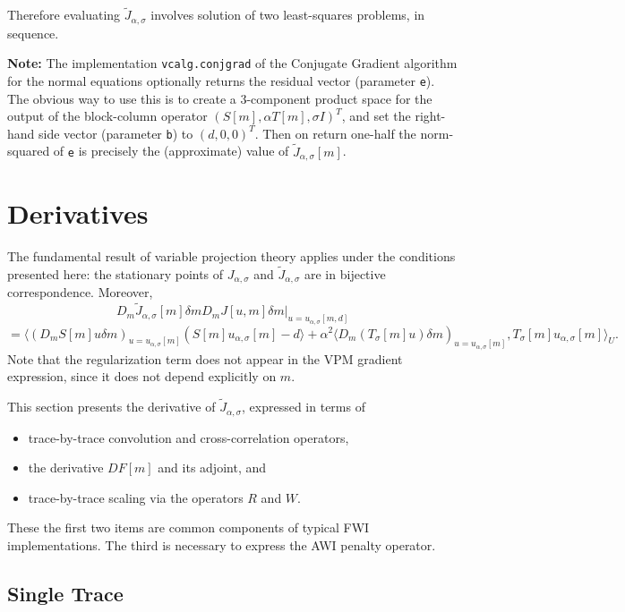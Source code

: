 Therefore evaluating $\tilde{J}_{\alpha,\sigma}$ involves solution of
two least-squares problems, in sequence.

{\bf Note:} The implementation {\tt vcalg.conjgrad} of the Conjugate Gradient algorithm for the normal equations optionally returns the residual vector (parameter {\tt e}). The obvious way to use this is to create a 3-component product space for the output of the block-column operator $(S[m],\alpha T[m], \sigma I)^T$, and set the right-hand side vector (parameter {\tt b})
to $(d,0,0)^T$. Then on return one-half the norm-squared of {\tt e} is precisely the (approximate) value of $\tilde{J}_{\alpha,\sigma}[m]$.

\section{Derivatives}
The fundamental result of variable projection theory
\cite[]{GolubPereyra:73} applies under the conditions presented here:
the stationary points of $J_{\alpha,\sigma}$ and
$\tilde{J}_{\alpha,\sigma}$ are in bijective correspondence. Moreover,
\[
D_m\tilde{J}_{\alpha,\sigma}[m]\delta m D_mJ[u,m]\delta m|_{u =
  u_{\alpha,\sigma}[m,d]}
\]
\begin{equation}
= \langle (D_mS[m]u\delta m)_{u =
  u_{\alpha,\sigma}[m]} (S[m]u_{\alpha,\sigma}[m]-d \rangle + \alpha^2 \langle D_m(T_{\sigma}[m]u)\delta m)_{u=u_{\alpha,\sigma}[m]},T_{\sigma}[m]u_{\alpha,\sigma}[m]\rangle_U.
\label{eqn:basederiv}
\end{equation}
Note that the regularization term does not appear in the VPM gradient expression, since it does not depend explicitly on $m$.

This section presents the derivative of $\tilde{J}_{\alpha,\sigma}$, expressed in terms of
\begin{itemize}
  \item trace-by-trace convolution and cross-correlation operators,
  \item the derivative $DF[m]$ and its adjoint, and
  \item trace-by-trace scaling via the operators $R$ and $W$.
\end{itemize}
These the first two items are common components of typical FWI implementations. The
third is necessary to express the AWI penalty operator.

\subsection{Single Trace}

